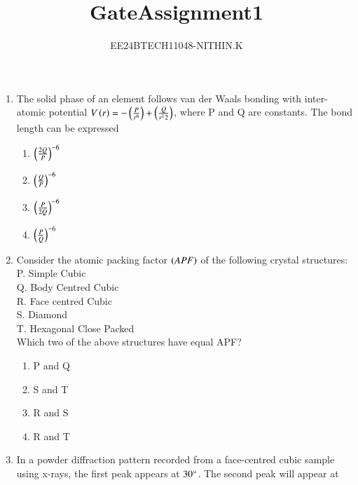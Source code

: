 \documentclass[journal]{IEEEtran}
\numberwithin{equation}{enumi}
\numberwithin{figure}{enumi}
\begin{document}


\title{GateAssignment1}
\author{EE24BTECH11048-NITHIN.K} 
{\let\newpage\relax\maketitle}
\begin{enumerate}
\section{Q.21 to Q.75 carry two marks each.}
	\item The solid phase of an element follows van der Waals bonding with inter-atomic potential $V\left(r\right) = -\left(\frac{P}{r^6}\right) + \left(\frac{Q}{r^12}\right)$, where P and Q are constants. The bond length can be expressed
		\begin{enumerate}
			\item $\left(\frac{2Q}{P}\right)^{-6}$
			\item $\left(\frac{Q}{P}\right)^{-6}$
			\item $\left(\frac{P}{2Q}\right)^{-6}$
			\item $\left(\frac{P}{Q}\right)^{-6}$
		\end{enumerate}
	\item Consider the atomic packing factor $\left(APF\right)$ of the following crystal structures: \\
		P. Simple Cubic \\
		Q. Body Centred Cubic \\
		R. Face centred Cubic \\
		S. Diamond \\
		T. Hexagonal Close Packed \\
		Which two of the above structures have equal APF?
		\begin{enumerate}
			\item P and Q
			\item S and T
			\item R and S
			\item R and T
		\end{enumerate}
	\item In a powder diffraction pattern recorded from a face-centred cubic sample using x-rays, the first peak appears at $30\degree$. The second peak will appear at
		\begin{enumerate}

\end{enumerate}
\end{enumerate}
\end{document}
